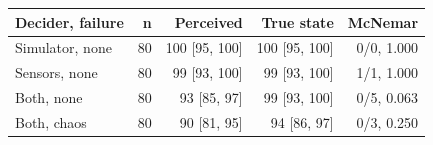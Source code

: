 \begin{tabular}{lrrrr}
\toprule
Decider, failure & n & Perceived & True state & McNemar \\
\midrule
Simulator, none & 80 & 100 [95, 100] & 100 [95, 100] & 0/0, 1.000 \\
Sensors, none & 80 & 99 [93, 100] & 99 [93, 100] & 1/1, 1.000 \\
Both, none & 80 & 93 [85, 97] & 99 [93, 100] & 0/5, 0.063 \\
Both, chaos & 80 & 90 [81, 95] & 94 [86, 97] & 0/3, 0.250 \\
\bottomrule
\end{tabular}

